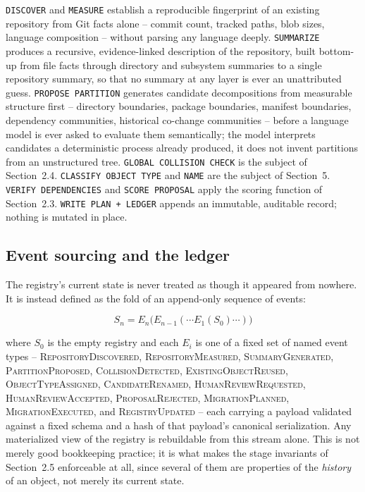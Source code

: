 \documentclass[11pt]{article}
\begin{document}
\texttt{DISCOVER} and \texttt{MEASURE} establish a reproducible fingerprint of an existing repository from Git facts alone -- commit count, tracked paths, blob sizes, language composition -- without parsing any language deeply. \texttt{SUMMARIZE} produces a recursive, evidence-linked description of the repository, built bottom-up from file facts through directory and subsystem summaries to a single repository summary, so that no summary at any layer is ever an unattributed guess. \texttt{PROPOSE PARTITION} generates candidate decompositions from measurable structure first -- directory boundaries, package boundaries, manifest boundaries, dependency communities, historical co-change communities -- before a language model is ever asked to evaluate them semantically; the model interprets candidates a deterministic process already produced, it does not invent partitions from an unstructured tree. \texttt{GLOBAL COLLISION CHECK} is the subject of Section~2.4. \texttt{CLASSIFY OBJECT TYPE} and \texttt{NAME} are the subject of Section~5. \texttt{VERIFY DEPENDENCIES} and \texttt{SCORE PROPOSAL} apply the scoring function of Section~2.3. \texttt{WRITE PLAN + LEDGER} appends an immutable, auditable record; nothing is mutated in place.

\subsection{Event sourcing and the ledger}

The registry's current state is never treated as though it appeared from nowhere. It is instead defined as the fold of an append-only sequence of events:

\begin{equation}
S_n = E_n\bigl(E_{n-1}(\cdots E_1(S_0)\cdots)\bigr)
\end{equation}

where $S_0$ is the empty registry and each $E_i$ is one of a fixed set of named event types -- \textsc{RepositoryDiscovered}, \textsc{RepositoryMeasured}, \textsc{SummaryGenerated}, \textsc{PartitionProposed}, \textsc{CollisionDetected}, \textsc{ExistingObjectReused}, \textsc{ObjectTypeAssigned}, \textsc{CandidateRenamed}, \textsc{HumanReviewRequested}, \textsc{HumanReviewAccepted}, \textsc{ProposalRejected}, \textsc{MigrationPlanned}, \textsc{MigrationExecuted}, and \textsc{RegistryUpdated} -- each carrying a payload validated against a fixed schema and a hash of that payload's canonical serialization. Any materialized view of the registry is rebuildable from this stream alone. This is not merely good bookkeeping practice; it is what makes the stage invariants of Section~2.5 enforceable at all, since several of them are properties of the \emph{history} of an object, not merely its current state.
\end{document}
